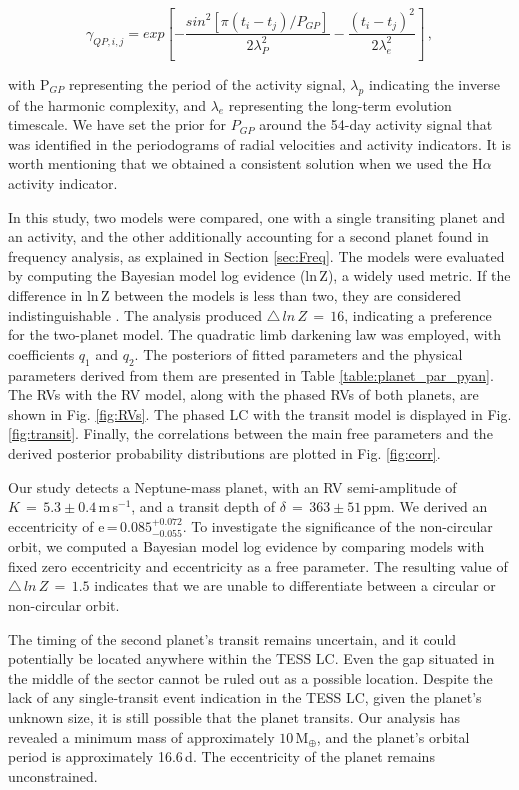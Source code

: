 \documentclass[traditabstract,longauth]{aa}
\begin{document}
\begin{equation}\label{eq_rot}
      {\gamma}_{QP,i,j} =
         { exp \left[ -\frac{sin^2\left[\pi(t_i-t_j)/P_{GP}\right]}{ 2{\lambda^2_P} } - \frac{(t_i-t_j)^2}{2{\lambda^2_e}}
                   \right]
}\,,
   \end{equation}

with P$_{GP}$ representing the period of the activity signal, $\lambda_p$ indicating the inverse of the harmonic complexity, and $\lambda_e$ representing the long-term evolution timescale. We have set the prior for $P_{GP}$ around the 54-day activity signal that was identified in the periodograms of radial velocities and activity indicators. It is worth mentioning that we obtained a consistent solution when we used the H$\alpha$ activity indicator.

In this study, two models were compared, one with a single transiting planet and an activity, and the other additionally accounting for a second planet found in frequency analysis, as explained in Section \ref{sec:Freq}. The models were evaluated by computing the Bayesian model log evidence (ln\,Z), a widely used metric. If the difference in ln\,Z between the models is less than two, they are considered indistinguishable \citep{Trotta08}. The analysis produced $\triangle\,ln\,Z\,=\,16$, indicating a preference for the two-planet model. The quadratic limb darkening law was employed, with coefficients $q_1$ and $q_2$. The posteriors of fitted parameters and the physical parameters derived from them are presented in Table \ref{table:planet_par_pyan}. The RVs with the RV model, along with the phased RVs of both planets, are shown in Fig. \ref{fig:RVs}. The phased LC with the transit model is displayed in Fig. \ref{fig:transit}. Finally, the correlations between the main free parameters and the derived posterior probability distributions are plotted in Fig. \ref{fig:corr}.

Our study detects a Neptune-mass planet, with an RV semi-amplitude of $K\,=\,5.3\pm0.4$\,m\,s$^{-1}$, and a transit depth of $\delta\,=\,363\pm51$\,ppm. We derived an eccentricity of e\,=\,$0.085^{+0.072}_{-0.055}$. To investigate the significance of the non-circular orbit, we computed a Bayesian model log evidence by comparing models with fixed zero eccentricity and eccentricity as a free parameter. The resulting value of $\triangle\,ln\,Z\,=\,1.5$ indicates that we are unable to differentiate between a circular or non-circular orbit. 

The timing of the second planet's transit remains uncertain, and it could potentially be located anywhere within the TESS LC. Even the gap situated in the middle of the sector cannot be ruled out as a possible location. Despite the lack of any single-transit event indication in the TESS LC, given the planet's unknown size, it is still possible that the planet transits. Our analysis has revealed a minimum mass of approximately $10\,$M$_{\oplus}$, and the planet's orbital period is approximately 16.6\,d. The eccentricity of the planet remains unconstrained.
\end{document}
